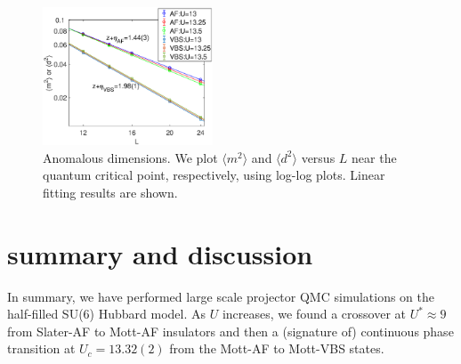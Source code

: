 \documentclass[twocolumn,superscriptaddress,prb]{revtex4-1}
\begin{document}
\begin{figure}
    \includegraphics[width=0.45\textwidth]{etaexponent}
    \caption{\label{fig:etaexponent}Anomalous dimensions. We plot $\langle m^2 \rangle$ and $\langle d^2 \rangle$ versus $L$ near the quantum critical point, respectively, using log-log plots. Linear fitting results are shown. }
\end{figure}



\section{summary and discussion}
In summary, we have performed large scale projector QMC simulations on the half-filled SU(6) Hubbard model. As $U$ increases, we found a crossover at $U^*\approx9$ from Slater-AF to Mott-AF insulators and then a (signature of) continuous phase transition at $U_c=13.32(2)$ from the Mott-AF to Mott-VBS states. 
\end{document}
